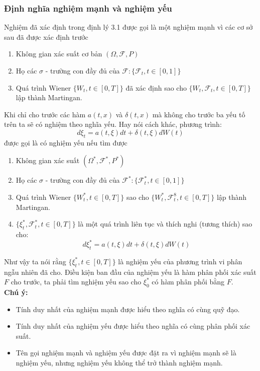 \documentclass[14pt,a4paper]{article}
\numberwithin{equation}{section}
\begin{document}
\subsubsection{Định nghĩa nghiệm mạnh và nghiệm yếu}
Nghiệm đã xác định trong định lý 3.1 được gọi là một nghiệm mạnh vì các cơ sở sau đã được xác định trước
\begin{enumerate}[1)]
	\item Không gian xác suất cơ bản $(\Omega,\mathscr{F},P)$
	\item Họ các $\sigma$ - trường con đầy đủ của $\mathscr{F}:\{\mathscr{F}_t,t\in[0,1]\}$
	\item Quá trình Wiener $\{W_t,t\in[0,T]\}$ đã xác định sao cho $\{W_t,\mathscr{F}_t,t\in[0,T]\}$ lập thành Martingan.
\end{enumerate}
Khi chỉ cho trước các hàm $a(t,x)$ và $\delta(t,x)$ mà không cho trước ba yếu tố trên ta sẽ có nghiệm theo nghĩa yếu. Hay nói cách khác, phương trình:
\begin{equation*}
	d\xi_t=a(t,\xi)dt+\delta(t,\xi)dW(t)
\end{equation*}
được gọi là có nghiệm yếu nếu tìm được
\begin{enumerate}[(1*)]
	\item Không gian xác suất $(\Omega^*,\mathscr{F}^*,P^*)$
	\item Họ các $\sigma$ - trường con đầy đủ của $\mathscr{F}^*:\{\mathscr{F}^*_t,t\in[0,1]\}$
	\item Quá trình Wiener $\{W_t^*,t\in[0,T]\}$ sao cho $\{W_t^*,\mathscr{F}^8_t,t\in[0,T]\}$ lập thành Martingan.
	\item $\{\xi_t^*,\mathscr{F}_t^*,t\in[0,T]\}$ là một quá trình liên tục và thích nghi (tương thích) sao cho:
	\begin{equation*}
		d\xi_t^*=a(t,\xi)dt+\delta(t,\xi)dW(t)	
	\end{equation*}
\end{enumerate}
Như vậy ta nói rằng $\{\xi_t^*,t\in[0,T]\}$ là nghiệm yếu của phương trình vi phân ngẫu nhiên đã cho. Điều kiện ban đầu của nghiệm yếu là hàm phân phối xác suất $F$ cho trước, ta phải tìm nghiệm yếu sao cho $\xi_0^*$ có hàm phân phối bằng $F$.\\
\textbf{Chú ý:}
\begin{itemize}[*]
	\item Tính duy nhất của nghiệm mạnh được hiểu theo nghĩa có cùng quỹ đạo.
	\item Tính duy nhất của nghiệm yếu được hiểu theo nghĩa có cùng phân phối xác suất.
	\item Tên gọi nghiệm mạnh và nghiệm yếu được đặt ra vì nghiệm mạnh sẽ là nghiệm yếu, nhưng nghiệm yếu không thể trở thành nghiệm mạnh.
\end{itemize}
\pagebreak
\end{document}
